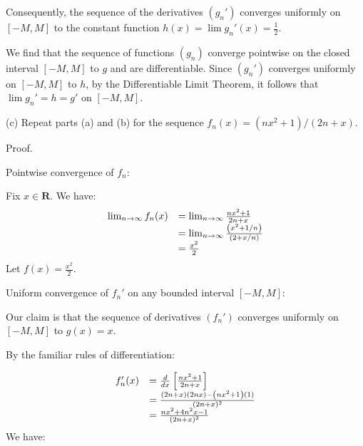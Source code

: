 \documentclass[10pt]{article}
\begin{document}
Consequently, the sequence of the derivatives $\displaystyle ( g_{n} ')$ converges uniformly on $\displaystyle [ -M,M]$ to the constant function $\displaystyle h( x) =\lim g_{n} '( x) =\frac{1}{2}$.



We find that the sequence of functions $\displaystyle ( g_{n})$ converge pointwise on the closed interval $\displaystyle [ -M,M]$ to $\displaystyle g$ and are differentiable. Since $\displaystyle ( g_{n} ')$ converges uniformly on $\displaystyle [ -M,M]$ to $\displaystyle h$, by the Differentiable Limit Theorem, it follows that $\displaystyle \lim g_{n} '=h=g'$ on $\displaystyle [ -M,M]$.



(c) Repeat parts (a) and (b) for the sequence $\displaystyle f_{n}( x) =\left( nx^{2} +1\right) /( 2n+x)$. 



Proof.



Pointwise convergence of $\displaystyle f_{n}$:



Fix $\displaystyle x\in \mathbf{R}$. We have:
\begin{equation*}
\begin{array}{ c l }
\lim _{n\rightarrow \infty } f_{n}( x) & =\lim _{n\rightarrow \infty }\frac{nx^{2} +1}{2n+x}\\
 & =\lim _{n\rightarrow \infty }\frac{\left( x^{2} +1/n\right)}{( 2+x/n)}\\
 & =\frac{x^{2}}{2}
\end{array}
\end{equation*}
Let $\displaystyle f( x) =\frac{x^{2}}{2}$. 



Uniform convergence of $\displaystyle f_{n} '$ on any bounded interval $\displaystyle [ -M,M]$:



Our claim is that the sequence of derivatives $\displaystyle ( f_{n} ')$ converges uniformly on $\displaystyle [ -M,M]$ to $\displaystyle g( x) =x$.



By the familiar rules of differentiation:


\begin{equation*}
\begin{array}{ c l }
f_{n} '( x) & =\frac{d}{dx}\left[\frac{nx^{2} +1}{2n+x}\right]\\
 & =\frac{( 2n+x)( 2nx) -\left( nx^{2} +1\right)( 1)}{( 2n+x)^{2}}\\
 & =\frac{nx^{2} +4n^{2} x-1}{( 2n+x)^{2}}
\end{array}
\end{equation*}
We have:
\end{document}
